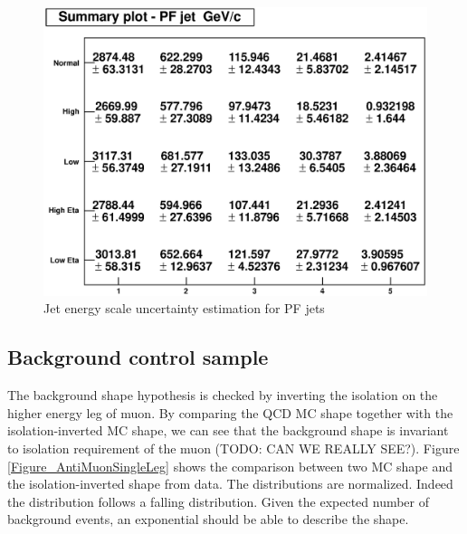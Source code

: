 \documentclass{cmspaper}
\begin{document}
\begin{figure}[hbtp]
\begin{center}
\includegraphics[width=150mm]{PFJet_JES}
\caption{Jet energy scale uncertainty estimation for PF jets}
\label{Figure_PFJetJES}
\end{center}
\end{figure}


\subsection{Background control sample}

The background shape hypothesis is checked by inverting the isolation on the higher energy leg of muon.
By comparing the QCD MC shape together with the isolation-inverted MC shape,
we can see that the background shape is invariant to isolation requirement of the muon (TODO: CAN WE REALLY SEE?).
Figure \ref{Figure_AntiMuonSingleLeg} shows the comparison between two MC shape and the isolation-inverted shape from data.
The distributions are normalized.
Indeed the distribution follows a falling distribution.
Given the expected number of background events, an exponential should be able to describe the shape.
\end{document}
